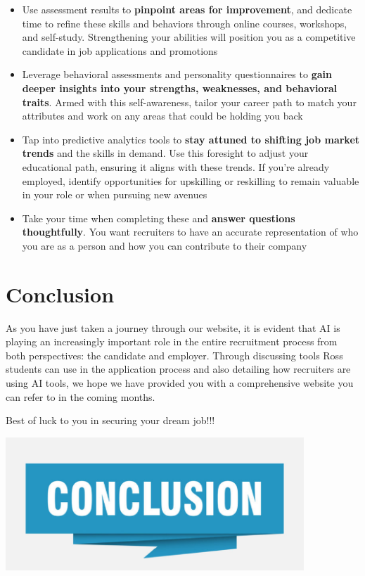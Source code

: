 \documentclass[
]{book}
\begin{document}
\begin{itemize}
\item
  Use assessment results to \textbf{pinpoint areas for improvement}, and dedicate time to refine these skills and behaviors through online courses, workshops, and self-study. Strengthening your abilities will position you as a competitive candidate in job applications and promotions
\item
  Leverage behavioral assessments and personality questionnaires to \textbf{gain deeper insights into your strengths, weaknesses, and behavioral traits}. Armed with this self-awareness, tailor your career path to match your attributes and work on any areas that could be holding you back
\item
  Tap into predictive analytics tools to \textbf{stay attuned to shifting job market trends} and the skills in demand. Use this foresight to adjust your educational path, ensuring it aligns with these trends. If you're already employed, identify opportunities for upskilling or reskilling to remain valuable in your role or when pursuing new avenues
\item
  Take your time when completing these and \textbf{answer questions thoughtfully}. You want recruiters to have an accurate representation of who you are as a person and how you can contribute to their company
\end{itemize}

\hypertarget{conclusion}{%
\chapter{Conclusion}\label{conclusion}}

As you have just taken a journey through our website, it is evident that AI is playing an increasingly important role in the entire recruitment process from both perspectives: the candidate and employer. Through discussing tools Ross students can use in the application process and also detailing how recruiters are using AI tools, we hope we have provided you with a comprehensive website you can refer to in the coming months.~

Best of luck to you in securing your dream job!!!

\includegraphics[width=4.41667in,height=\textheight]{conclusion pic.png}
\end{document}
